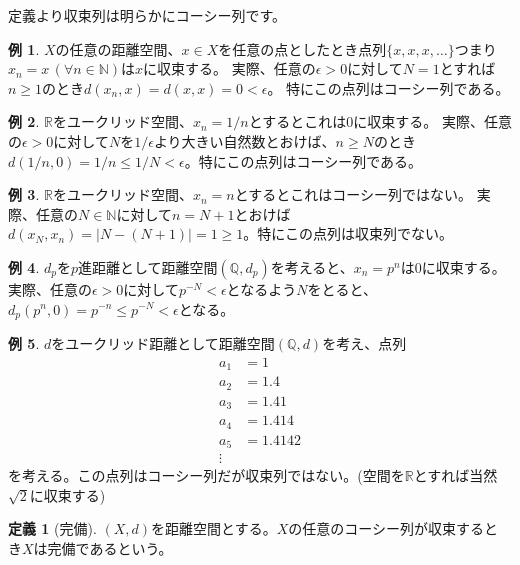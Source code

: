 \documentclass[uplatex]{jsarticle}
\newcommand{\Q}{\mathbb{Q}}
\newcommand{\R}{\mathbb{R}}
\theoremstyle{definition} %
\newtheorem{defi}[thm]{定義}
\newtheorem*{example*}{例}
\begin{document}
定義より収束列は明らかにコーシー列です。

\begin{example*}
$X$の任意の距離空間、$x \in X$を任意の点としたとき点列$\{x, x, x, \dots\}$つまり$x_n = x \,(\forall n \in \mathbb{N})$は$x$に収束する。
実際、任意の$\epsilon > 0$に対して$N = 1$とすれば$n \geq 1$のとき$d(x_n, x) = d(x, x) = 0 < \epsilon$。
特にこの点列はコーシー列である。
\end{example*}

\begin{example*}
$\R$をユークリッド空間、$x_n = 1/n$とするとこれは$0$に収束する。
実際、任意の$\epsilon > 0$に対して$N$を$1 / \epsilon$より大きい自然数とおけば、$n \geq N$のとき$d(1/n, 0) = 1/n \leq 1/N < \epsilon$。特にこの点列はコーシー列である。
\end{example*}

\begin{example*}
$\R$をユークリッド空間、$x_n = n$とするとこれはコーシー列ではない。
実際、任意の$N \in \mathbb{N}$に対して$n = N+1$とおけば$d(x_N, x_{n}) = |N - (N+1)| = 1 \geq 1$。特にこの点列は収束列でない。
\end{example*}

\begin{example*}
$d_p$を$p$進距離として距離空間$(\Q, d_p)$を考えると、$x_n = p^n$は$0$に収束する。
実際、任意の$\epsilon > 0$に対して$p^{-N} < \epsilon$となるよう$N$をとると、$d_p(p^n, 0) = p^{-n} \leq p^{-N} < \epsilon$となる。
\end{example*}

\begin{example*}
$d$をユークリッド距離として距離空間$(\Q, d)$を考え、点列
\begin{align*}
a_1 &= 1 \\
a_2 &= 1.4 \\
a_3 &= 1.41 \\
a_4 &= 1.414 \\
a_5 &= 1.4142 \\
\vdots
\end{align*}
を考える。この点列はコーシー列だが収束列ではない。(空間を$\R$とすれば当然$\sqrt 2$に収束する)
\end{example*}

\begin{oframed}\begin{defi}[完備]
$(X, d)$を距離空間とする。$X$の任意のコーシー列が収束するとき$X$は完備であるという。
\end{defi}\end{oframed}
\end{document}
